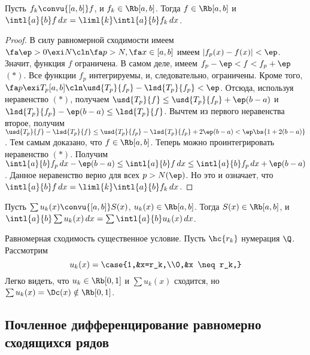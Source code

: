 \documentclass[a4paper]{article}
\newcommand{\intlab}{\intl{a}{b}}
\begin{document}
\begin{theorem}[Об интегрировании]
Пусть $f_k\convu{[a,b]}f$, и $f_k \in\Rb[a,b]$. Тогда $f \in\Rb[a,b]$ и $\intlab f\,d
x=\liml{k}\intlab f_k\,d x$.
\end{theorem}
\begin{proof}
В силу равномерной сходимости имеем $\fa \ep >0 \exi N\cln \fa p>N, \fa x \in [a,b]$ имеем
$|f_p(x)-f(x)|<\ep$. Значит, функция $f$ ограничена. В самом деле, имеем $f_p -\ep < f < f_p+\ep$
$(*)$. Все функции $f_p$ интегрируемы, и, следовательно, ограничены. Кроме того, $\fa p \exi
T_p[a,b]\cln \usd{T_p}{f_p}-\lsd{T_p}{f_p} < \ep$. Отсюда, используя неравенство $(*)$, получаем
$\usd{T_p}{f} \le \usd{T_p}{f_p}+\ep(b-a)$ и $\lsd{T_p}{f_p}-\ep(b-a) \le \lsd{T_p}{f}$. Вычтем из
первого неравенства второе, получим $\usd{T_p}{f}-\lsd{T_p}{f} \le
\usd{T_p}{f_p}-\lsd{T_p}{f_p}+2\ep(b-a) < \ep\bs{1+2(b-a)}$. Тем самым доказано, что $f
\in\Rb[a,b]$. Теперь можно проинтегрировать неравенство $(*)$. Получим $\intlab f_p\,d x
-\ep(b-a)\le \intlab f\,d x\le \intlab f_p\,d x+\ep(b-a)$. Данное неравенство верно для всех
$p>N(\ep)$. Но это и означает, что $\intlab f\,d x=\liml{k}\intlab f_k\,d x$.
\end{proof}

\begin{imp}
Пусть $\sum u_k(x)\convu{[a,b]}S(x)$, $u_k(x)\in\Rb[a,b]$. Тогда $S(x) \in\Rb[a,b]$, и $\intlab
\sum u_k(x)\,d x=\sum \intlab u_k(x)\,d x$.
\end{imp}

\begin{note}
Равномерная сходимость существенное условие. Пусть $\hc{r_k}$ нумерация $\Q$. Рассмотрим
$$u_k(x) =\case{1,&x=r_k,\\0,&x \neq r_k,}$$
Легко видеть, что $u_k \in\Rb[0,1]$ и $\sum u_k(x)$ сходится,
но $\sum u_k(x) = \Dc(x) \notin \Rb[0,1]$.
\end{note}

\subsection{Почленное дифференцирование равномерно сходящихся рядов}
\end{document}
